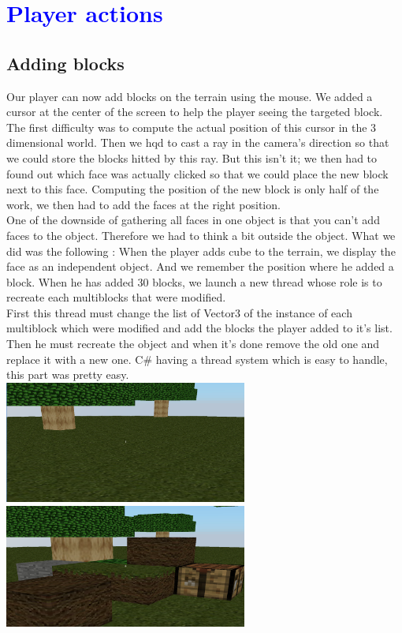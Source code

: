 \documentclass[article]{report}             %
\begin{document}
		\chapter{\textcolor{blue}{Player actions}}
			\section{Adding blocks}
				Our player can now add blocks on the terrain using the mouse. We added a cursor at the center of the screen to help the player seeing the targeted block. \\

The first difficulty was to compute the actual position of this cursor in the 3 dimensional world. Then we hqd to cast a ray in the camera's direction so that we could store the blocks hitted by this ray. But this isn't it; we then had to found out which face was actually clicked so that we could place the new block next to this face. Computing the position of the new block is only half of the work, we then had to add the faces at the right position.\\

				One of the downside of gathering all faces in one object is that you can't add faces to the object. Therefore we had to think a bit outside the object. What we did was the following : When the player adds cube to the terrain, we display the face as an independent object. And  we remember the position where he added a block. When he has added 30 blocks, we launch a new thread whose role is to recreate each multiblocks that were modified.\\

				First this thread must change the list of Vector3 of the instance of each multiblock which were modified and add the blocks the player added to it's list. Then he must recreate the object and when it's done remove the old one and replace it with a new one. C\# having a thread system which is easy to handle, this part was pretty easy. \\


				\includegraphics[width = 8cm]{images/Graphics/beforeAdd.png}		
				\includegraphics[width = 8cm]{images/Graphics/afterAdd.png} \newpage
\end{document}
